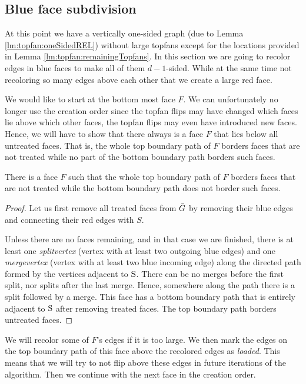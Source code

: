 
\subsection{Blue face subdivision}
\thispagestyle{plain}
\label{ss:subdiv}
  At this point we have a vertically one-sided graph (due to Lemma \ref{lm:topfan:oneSidedREL}) without large topfans except for the locations provided in Lemma \ref{lm:topfan:remainingTopfans}.
  In this section we are going to recolor edges in blue faces to make all of them $d-1$-sided.
  While at the same time not recoloring so many edges above each other that we create a large red face.

  We would like to start at the bottom most face $F$. We can unfortunately no longer use the creation order since the topfan flips may have changed which faces lie above which other faces, the topfan flips may even have introduced new faces.
  Hence, we will have to show that there always is a face $F$  that lies below all untreated faces. That is, the whole top boundary path of $F$ borders faces that are not treated while no part of the bottom boundary path borders such faces.

  \begin{lemma}
    \label{lm:}
    There is a face $F$ such that the whole top boundary path of $F$ borders faces that are not treated while the bottom boundary path does not border such faces.
  \end{lemma}
  \begin{proof}
    Let us first remove all treated faces from $\bar{G}$ by removing their blue edges and connecting their red edges with $S$.

    Unless there are no faces remaining, and in that case we are finished, there is at least one \emph{splitvertex} (vertex with at least two outgoing blue edges) and one \emph{mergevertex} (vertex with at least two blue incoming edge) along the directed path formed by the vertices adjacent to $\mathrm{S}$.
    There can be no merges before the first split, nor splits after the last merge.
    Hence, somewhere along the path there is a split followed by a merge.
    This face has a bottom boundary path that is entirely adjacent to $\mathrm{S}$ after removing treated faces.
    The top boundary path borders untreated faces.
  \end{proof}


  We will recolor some of $F$'s edges if it is too large.
  We then mark the edges on the top boundary path of this face above the recolored edges as \emph{loaded}. This means that we will try to not flip above these edges in future iterations of the algorithm.
  Then we continue with the next face in the creation order.

